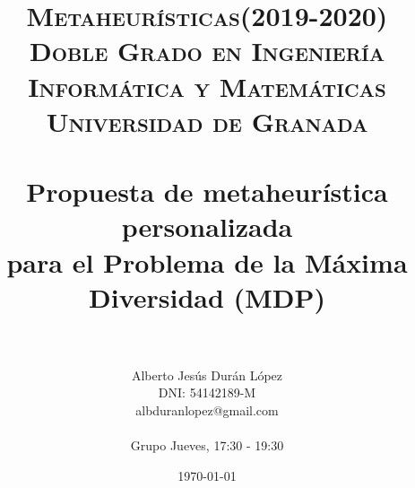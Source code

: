 

\usepackage{algpseudocode}
\usepackage[spanish]{babel}
\usepackage{varwidth}
\usepackage{hyperref}
\usepackage{graphicx}
\usepackage{epstopdf}


\usepackage[spanish,onelanguage]{algorithm2e} %
\usepackage[lmargin=3.81cm,tmargin=2.54cm,rmargin=2.54cm,bmargin=2.52cm]{geometry}
\usepackage{movie15}

\title{	
\normalfont \normalsize 
\textsc{\textbf{Metaheurísticas(2019-2020)} \\ Doble Grado en Ingeniería Informática y Matemáticas \\ Universidad de Granada} \\ [25pt] %
\horrule{0.5pt} \\[0.4cm] %
\huge Propuesta de metaheurística personalizada \\ para el Problema de la Máxima Diversidad  (MDP) \\ %
\horrule{2pt} \\[0.5cm] %
}
\author{Alberto Jesús Durán López \\ 
DNI: 54142189-M \\
albduranlopez@gmail.com \\
\hfill \break \hspace{1cm}\\
Grupo Jueves, 17:30 - 19:30 } %


\date{\normalsize\today} %




\maketitle %

\newpage %

\tableofcontents %

